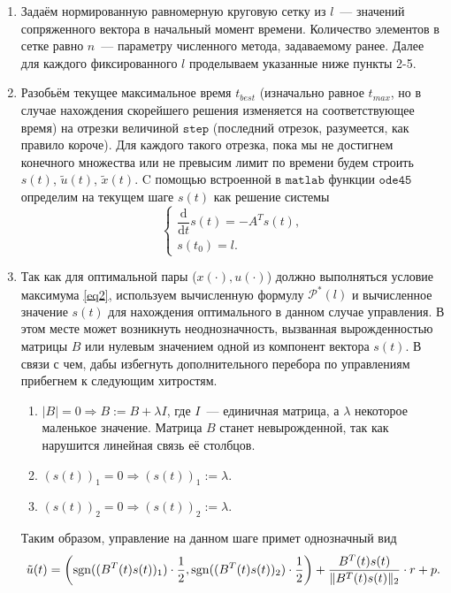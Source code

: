 \documentclass[a4paper,11pt]{article}
\begin{document}
\begin{itemize}
\begin{enumerate}
\item Задаём нормированную равномерную круговую сетку из $l$~--- значений сопряженного вектора в начальный момент времени. Количество элементов в сетке равно $n$~--- параметру численного метода, задаваемому ранее. Далее для каждого фиксированного $l$ проделываем указанные ниже пункты 2-5.

\item Разобьём текущее максимальное время $\texttt{$t_{best}$}$ (изначально равное $\texttt{$t_{max}$}$, но в случае нахождения скорейшего решения изменяется на соответствующее время) на отрезки величиной $\texttt{step}$ (последний отрезок, разумеется, как правило короче). Для каждого такого отрезка, пока мы не достигнем конечного множества или не превысим лимит по времени будем строить $s(t)$, $\tilde{u}(t)$, $\tilde{x}(t)$. C помощью встроенной в $\texttt{matlab}$ функции $\texttt{ode45}$ определим на текущем шаге $s(t)$ как решение системы
$$\begin{cases} 
\dfrac{\mathrm{d}}{\mathrm{d}t}s(t) = -A^{T}s(t), \\
s(t_0) = l.  
\end{cases} $$

\item Так как для оптимальной пары ($x(\cdot), u(\cdot)$) должно выполняться условие максимума \eqref{eq2}, используем вычисленную формулу $\mathcal{P}^*(l)$ и вычисленное значение $s(t)$ для нахождения оптимального в данном случае управления. В этом месте может возникнуть неоднозначность, вызванная вырожденностью матрицы $B$ или нулевым значением одной из компонент вектора $s(t)$. В связи с чем, дабы избегнуть дополнительного перебора по управлениям прибегнем к следующим хитростям.

\begin{enumerate}

\item $|B| = 0 \Rightarrow B := B + \lambda I$, где $I$~--- единичная матрица, а $\lambda$ некоторое маленькое значение. Матрица $B$ станет невырожденной, так как нарушится линейная связь её столбцов.

\item $(s(t))_1 = 0 \Rightarrow (s(t))_1 := \lambda.$

\item $(s(t))_2 = 0 \Rightarrow (s(t))_2 := \lambda.$

\end{enumerate}

Таким образом, управление на данном шаге примет однозначный вид
\[ \tilde{u}(t) = \left( \mathrm{sgn}((B^{T}(t) s(t))_1) \cdot \dfrac{1}{2}, \mathrm{sgn}((B^{T}(t) s(t))_2) \cdot \dfrac{1}{2} \right) + \dfrac{B^{T}(t) s(t)}{\| B^{T}(t) s(t) \|_2} \cdot r + p.\]


\end{enumerate}
\end{itemize}
\end{document}
